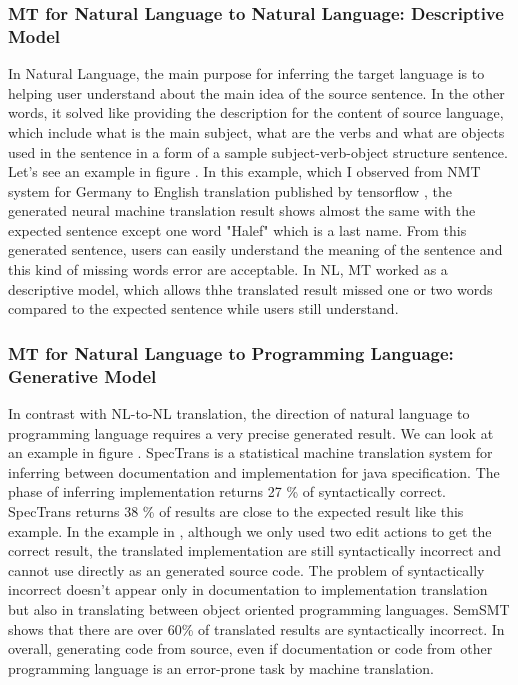 \subsubsection{MT for Natural Language to Natural Language: Descriptive Model}
In Natural Language, the main purpose for inferring the target language is to helping user understand about the main idea of the source sentence. In the other words, it solved like providing the description for the content of source language, which include what is the main subject, what are the verbs and what are objects used in the sentence in a form of a sample subject-verb-object structure sentence. Let's see an example in figure \cite{}. In this example, which I observed from NMT system for Germany to English translation published by tensorflow \cite{}, the generated neural machine translation result shows almost the same with the expected sentence except one word "Halef" which is a last name. From this generated sentence, users can easily understand the meaning of the sentence and this kind of missing words error are acceptable. In NL, MT worked as a descriptive model, which allows thhe translated result missed one or two words compared to the expected sentence while users still understand.
\subsubsection{MT for Natural Language to Programming Language: Generative Model}
In contrast with NL-to-NL translation, the direction of natural language to programming language requires a very precise generated result. We can look at an example in figure \cite{}. SpecTrans \cite{} is a statistical machine translation system for inferring between documentation and implementation for java specification. The phase of inferring implementation returns 27 \% of syntactically correct. SpecTrans returns 38 \% of results are close to the expected result like this example. In the example in \cite{}, although we only used two edit actions to get the correct result, the translated implementation are still syntactically incorrect and cannot use directly as an generated source code. The problem of syntactically incorrect doesn't appear only in documentation to implementation translation but also in translating between object oriented programming languages. SemSMT \cite{} shows that there are over 60\% of translated results are syntactically incorrect. In overall, generating code from source, even if documentation or code from other programming language is an error-prone task by machine translation.

